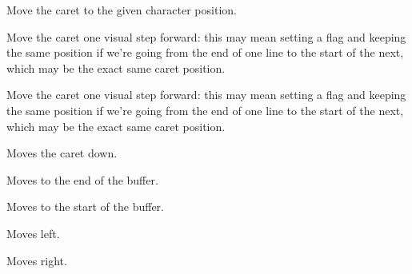 
Move the caret to the given character position.

\label{wxrichtextctrlmovecaretback}


Move the caret one visual step forward: this may mean setting a flag
and keeping the same position if we're going from the end of one line
to the start of the next, which may be the exact same caret position.

\label{wxrichtextctrlmovecaretforward}


Move the caret one visual step forward: this may mean setting a flag
and keeping the same position if we're going from the end of one line
to the start of the next, which may be the exact same caret position.

\label{wxrichtextctrlmovedown}


Moves the caret down.

\label{wxrichtextctrlmoveend}


Moves to the end of the buffer.

\label{wxrichtextctrlmovehome}


Moves to the start of the buffer.

\label{wxrichtextctrlmoveleft}


Moves left.

\label{wxrichtextctrlmoveright}


Moves right.

\label{wxrichtextctrlmovetolineend}

